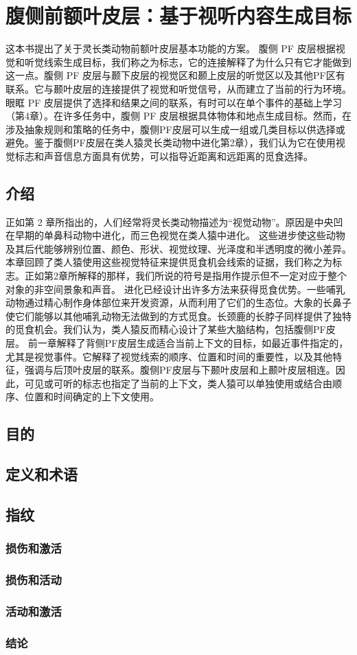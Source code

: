 \chapter{腹侧前额叶皮层：基于视听内容生成目标}
这本书提出了关于灵长类动物前额叶皮层基本功能的方案。
腹侧 PF 皮层根据视觉和听觉线索生成目标，我们称之为标志，它的连接解释了为什么只有它才能做到这一点。腹侧 PF 皮层与颞下皮层的视觉区和颞上皮层的听觉区以及其他PF区有联系。它与颞叶皮层的连接提供了视觉和听觉信号，从而建立了当前的行为环境。眼眶 PF 皮层提供了选择和结果之间的联系，有时可以在单个事件的基础上学习（第4章）。在许多任务中，腹侧 PF 皮层根据具体物体和地点生成目标。然而，在涉及抽象规则和策略的任务中，腹侧PF皮层可以生成一组或几类目标以供选择或避免。鉴于腹侧PF皮层在类人猿灵长类动物中进化第2章），我们认为它在使用视觉标志和声音信息方面具有优势，可以指导近距离和远距离的觅食选择。
\section{介绍}
正如第 2 章所指出的，人们经常将灵长类动物描述为“视觉动物”。原因是中央凹在早期的单鼻科动物中进化，而三色视觉在类人猿中进化。 这些进步使这些动物及其后代能够辨别位置、颜色、形状、视觉纹理、光泽度和半透明度的微小差异。本章回顾了类人猿使用这些视觉特征来提供觅食机会线索的证据，我们称之为标志。正如第2章所解释的那样，我们所说的符号是指用作提示但不一定对应于整个对象的非空间景象和声音。
进化已经设计出许多方法来获得觅食优势。一些哺乳动物通过精心制作身体部位来开发资源，从而利用了它们的生态位。大象的长鼻子使它们能够以其他哺乳动物无法做到的方式觅食。长颈鹿的长脖子同样提供了独特的觅食机会。我们认为，类人猿反而精心设计了某些大脑结构，包括腹侧PF皮层。
前一章解释了背侧PF皮层生成适合当前上下文的目标，如最近事件指定的，尤其是视觉事件。它解释了视觉线索的顺序、位置和时间的重要性，以及其他特征，强调与后顶叶皮层的联系。腹侧PF皮层与下颞叶皮层和上颞叶皮层相连。因此，可见或可听的标志也指定了当前的上下文，类人猿可以单独使用或结合由顺序、位置和时间确定的上下文使用。
\section{目的}

\section{定义和术语}


\section{指纹}

\subsection{损伤和激活}

\subsection{损伤和活动}

\subsection{活动和激活}




\subsection{结论}


